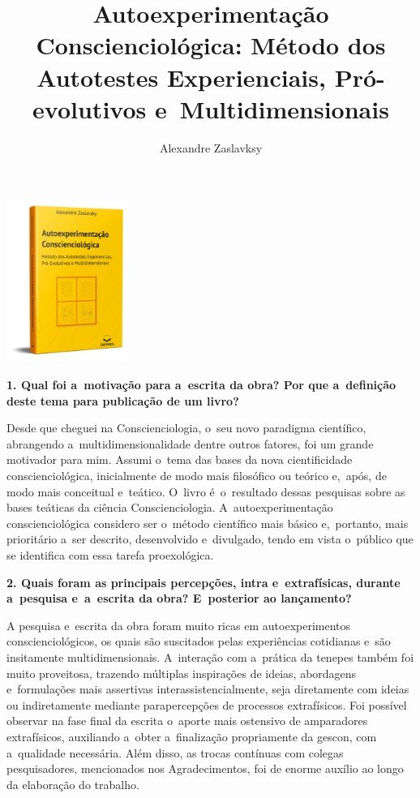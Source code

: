 \documentclass{gescons}
\author{Alexandre Zaslavksy}
\title{Autoexperimentação Conscienciológica: Método dos Autotestes Experienciais, Pró-evolutivos e~Multidimensionais}
\begin{document}
    \makeentrevistatitle

    
    \begin{multicols}{2}

\begin{center}
    \includegraphics[width=4cm]{articles/entrevista/mockups/Alexandre-Zas.png}
\end{center}

\textbf{1. Qual foi a~motivação para a~escrita da obra? Por que a~definição deste tema para publicação de um livro?}

Desde que cheguei na Conscienciologia, o~seu novo paradigma científico, abrangendo a~multidimensionalidade dentre outros fatores, foi um grande motivador para mim. Assumi o~tema das bases da nova cientificidade conscienciológica, inicialmente de modo mais filosófico ou teórico e,~após, de modo mais conceitual e~teático. O~livro é~o~resultado dessas pesquisas sobre as bases teáticas da ciência Conscienciologia. A~autoexperimentação conscienciológica considero ser o~método científico mais básico e,~portanto, mais prioritário a~ser descrito, desenvolvido e~divulgado, tendo em vista o~público que se identifica com essa tarefa proexológica.

\textbf{2.       Quais foram as principais percepções, intra e~extrafísicas, durante a~pesquisa e~a~escrita da obra? E~posterior ao lançamento?}

A pesquisa e~escrita da obra foram muito ricas em autoexperimentos conscienciológicos, os quais são suscitados pelas experiências cotidianas e~são insitamente multidimensionais. A~interação com a~prática da tenepes também foi muito proveitosa, trazendo múltiplas inspirações de ideias, abordagens e~formulações mais assertivas interassistencialmente, seja diretamente com ideias ou indiretamente mediante parapercepções de processos extrafísicos. Foi possível observar na fase final da escrita o~aporte mais ostensivo de amparadores extrafísicos, auxiliando a~obter a~finalização propriamente da gescon, com a~qualidade necessária. Além disso, as trocas contínuas com colegas pesquisadores, mencionados nos Agradecimentos, foi de enorme auxílio ao longo da elaboração do trabalho.




\end{multicols}
\end{document}
